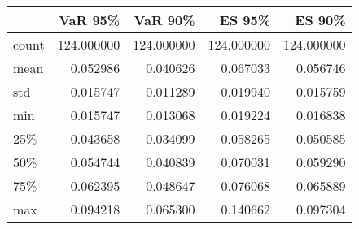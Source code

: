 \begin{tabular}{lrrrr}
\toprule
{} &     VaR 95\% &     VaR 90\% &      ES 95\% &      ES 90\% \\
\midrule
count &  124.000000 &  124.000000 &  124.000000 &  124.000000 \\
mean  &    0.052986 &    0.040626 &    0.067033 &    0.056746 \\
std   &    0.015747 &    0.011289 &    0.019940 &    0.015759 \\
min   &    0.015747 &    0.013068 &    0.019224 &    0.016838 \\
25\%   &    0.043658 &    0.034099 &    0.058265 &    0.050585 \\
50\%   &    0.054744 &    0.040839 &    0.070031 &    0.059290 \\
75\%   &    0.062395 &    0.048647 &    0.076068 &    0.065889 \\
max   &    0.094218 &    0.065300 &    0.140662 &    0.097304 \\
\bottomrule
\end{tabular}

